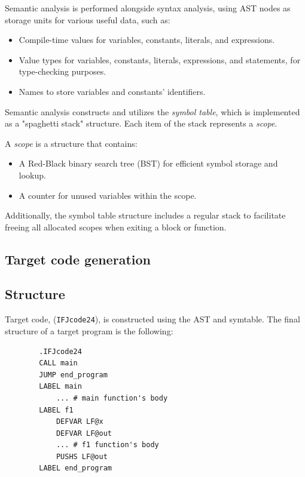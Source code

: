 \documentclass[a4paper, 11pt]{article}
\begin{document}
    Semantic analysis is performed alongside syntax analysis, using AST nodes as storage units for various useful data, such as:
    \begin{itemize}
        \item Compile-time values for variables, constants, literals, and expressions.
        \item Value types for variables, constants, literals, expressions, and statements, for type-checking purposes.
        \item Names to store variables and constants' identifiers.
    \end{itemize}
    
    Semantic analysis constructs and utilizes the \textit{symbol table}, which is implemented as a "spaghetti stack" structure. Each item of the stack represents a \textit{scope}. 
    
    A \textit{scope} is a structure that contains:
    \begin{itemize}
        \item A Red-Black binary search tree (BST) for efficient symbol storage and lookup.
        \item A counter for unused variables within the scope.
    \end{itemize}
    
    Additionally, the symbol table structure includes a regular stack to facilitate freeing all allocated scopes when exiting a block or function.
    
    

	\subsection{Target code generation}

        \subsection*{Structure}

        Target code, (\texttt{IFJcode24}), is constructed using the AST and symtable. The final structure of a target program is the following:
        \begin{verbatim}
        .IFJcode24
        CALL main
        JUMP end_program
        LABEL main
            ... # main function's body
        LABEL f1
            DEFVAR LF@x
            DEFVAR LF@out
            ... # f1 function's body
            PUSHS LF@out
        LABEL end_program
        \end{verbatim}
\end{document}
